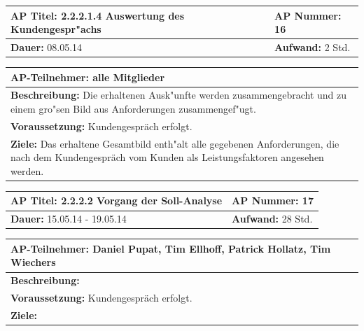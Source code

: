 \documentclass[fontsize=12pt,paper=a4,twoside]{scrartcl}
\begin{document}
\begin{tabular}{|p{7.43cm}|p{7.43cm}|}
\hline
\textbf{AP Titel: }2.2.2.1.4 Auswertung des Kundengespr"achs & \textbf{AP Nummer: }16\\ 
\hline
\textbf{Dauer: }08.05.14& \textbf{Aufwand: } 2 Std.\\
\hline
\end{tabular}
\begin{tabular}{|p{15.3cm}|}
\hline
\textbf{AP-Teilnehmer: }alle Mitglieder\\
\hline
\textbf{Beschreibung: }Die erhaltenen Ausk"unfte werden zusammengebracht und zu einem gro"sen Bild aus Anforderungen zusammengef"ugt.\\
\hline
\textbf{Voraussetzung: }Kundengespräch erfolgt.\\
\hline 
\textbf{Ziele: }Das erhaltene Gesamtbild enth"alt alle gegebenen Anforderungen, die nach dem Kundengespräch vom Kunden als Leistungsfaktoren angesehen werden.\\
\hline 
\end{tabular}

\begin{tabular}{|p{7.43cm}|p{7.43cm}|}
\hline
\textbf{AP Titel: }2.2.2.2 Vorgang der Soll-Analyse & \textbf{AP Nummer: }17\\ 
\hline
\textbf{Dauer: }15.05.14 - 19.05.14 & \textbf{Aufwand: } 28 Std.\\
\hline
\end{tabular}
\begin{tabular}{|p{15.3cm}|}
\hline
\textbf{AP-Teilnehmer: }Daniel Pupat, Tim Ellhoff, Patrick Hollatz, Tim Wiechers\\
\hline
\textbf{Beschreibung: }\\
\hline
\textbf{Voraussetzung: }Kundengespräch erfolgt.\\
\hline 
\textbf{Ziele: }\\
\hline 
\end{tabular}
\end{document}
